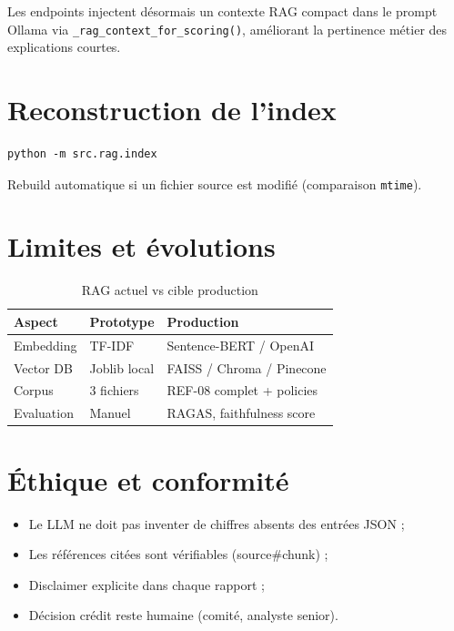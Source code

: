 Les endpoints  injectent désormais un contexte RAG compact dans le prompt Ollama via \texttt{\_rag\_context\_for\_scoring()}, améliorant la pertinence métier des explications courtes.

\section{Reconstruction de l'index}

\begin{lstlisting}[caption={Rebuild manuel de l'index RAG}]
python -m src.rag.index
\end{lstlisting}

Rebuild automatique si un fichier source est modifié (comparaison \texttt{mtime}).

\section{Limites et évolutions}

\begin{table}[H]
  \centering
  \caption{RAG actuel vs cible production}
  \begin{tabular}{|l|l|l|}
    \hline
    Aspect & Prototype & Production \\
    \hline
    Embedding & TF-IDF & Sentence-BERT / OpenAI \\
    \hline
    Vector DB & Joblib local & FAISS / Chroma / Pinecone \\
    \hline
    Corpus & 3 fichiers & REF-08 complet + policies \\
    \hline
    Evaluation & Manuel & RAGAS, faithfulness score \\
    \hline
  \end{tabular}
\end{table}

\section{Éthique et conformité}

\begin{itemize}[leftmargin=*]
  \item Le LLM ne doit pas inventer de chiffres absents des entrées JSON ;
  \item Les références citées sont vérifiables (source\#chunk) ;
  \item Disclaimer explicite dans chaque rapport ;
  \item Décision crédit reste humaine (comité, analyste senior).
\end{itemize}
